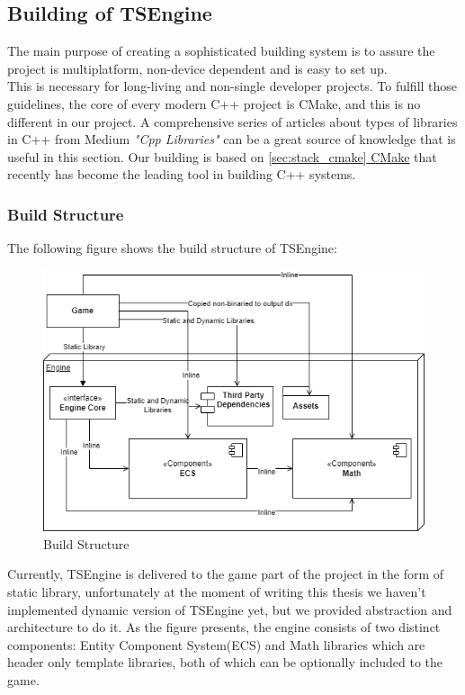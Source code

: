 \newpage
\subsection{Building of TSEngine}
\label{sec:build}
\hspace{\parindent} The main purpose of creating a sophisticated building system is to assure the project is multiplatform, non-device dependent and is easy to set up.\\ This is necessary for long-living and non-single developer projects.
To fulfill those guidelines, the core of every modern C++ project is CMake, and this is no different in our project.
A comprehensive series of articles about types of libraries in C++ from Medium \textit{"Cpp Libraries"} \cite{cpplibs} can be a great source of knowledge that is useful in this section.
Our building is based on \hyperref[sec:stack_cmake]{\ref*{sec:stack_cmake} CMake} that recently has become the leading tool in building C++ systems.
\subsubsection{Build Structure}
\hspace{\parindent} The following figure shows the build structure of TSEngine:
\label{fig:build_struct}
\begin{figure}[H]
  \includegraphics[width=\linewidth]{figures/build.png}
  \caption{Build Structure}
\end{figure}
Currently, TSEngine is delivered to the game part of the project in the form of static library, unfortunately at the moment of writing this thesis we haven't implemented dynamic version of TSEngine yet, but we provided abstraction and architecture to do it.
As the  figure presents, the engine consists of two distinct components: Entity Component System(ECS) and Math libraries which are header only template libraries, both of which can be optionally included to the game.

